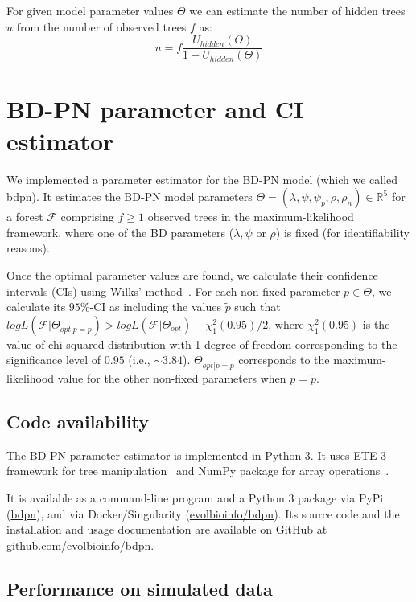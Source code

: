 \documentclass[a4paper,10pt]{article}
\begin{document}
For given model parameter values $\Theta$ we can estimate the number of hidden trees $u$ from the number of observed trees $f$ as:
\begin{equation}
u = f \frac{U_{hidden}(\Theta)}{1 - U_{hidden}(\Theta)}\label{eq:u} 
\end{equation}


\section{BD-PN parameter and CI estimator}\label{sec:sim}
We implemented a parameter estimator for the BD-PN model (which we called bdpn). It estimates the BD-PN model parameters  $\Theta = (\lambda,\psi,\psi_p,\rho,\rho_n) \in \mathbb{R}^5$ for a forest $\mathscr{F}$ comprising $f \geq 1$ observed trees in the maximum-likelihood framework, where one of the BD parameters ($\lambda,\psi$ or $\rho$) is fixed (for identifiability reasons). 

Once the optimal parameter values are found, we calculate their confidence intervals (CIs) using Wilks' method~\citep{Wilks1938}.
For each non-fixed parameter $p \in \Theta$, we calculate its $95\%$-CI as including the values $\tilde{p}$ such that $log L(\mathscr{F}|\Theta_{opt|p=\tilde{p}}) > log L(\mathscr{F}| \Theta_{opt}) - \chi^2_1(0.95) / 2$, where $\chi^2_1(0.95)$ is the value of chi-squared distribution with 1 degree of freedom corresponding to the significance level of $0.95$ (i.e., $\sim3.84$). $\Theta_{opt|p=\tilde{p}}$ corresponds to the maximum-likelihood value for the other non-fixed parameters when $p = \tilde{p}$. 

\subsection*{Code availability}
The BD-PN parameter estimator is implemented in Python 3. It uses ETE 3 framework for tree manipulation~\citep{Huerta-Cepas2016} and NumPy package for array operations~\citep{harris_array_2020}. 

It is available as a command-line program and a Python 3 package via PyPi (\href{https://pypi.org/project/bdpn}{bdpn}), and via Docker/Singularity (\href{https://hub.docker.com/r/evolbioinfo/bdpn/tags}{evolbioinfo/bdpn}). Its source code and the installation and usage documentation are available on GitHub at \href{https://github.com/evolbioinfo/bdpn}{github.com/evolbioinfo/bdpn}.

\subsection{Performance on simulated data}
\end{document}
